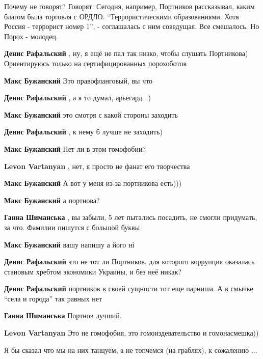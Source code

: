 \begin{itemize}

Почему не говорят? Говорят. Сегодня, например, Портников рассказывал, каким
благом была торговля с ОРДЛО. \enquote{Террористическими образованиями. Хотя Россия -
террорист номер 1}, - соглашалась с ним соведущая. Все смешалось. Но Порох -
молодец.

\begin{itemize} %
\textbf{Денис Рафальский} , ну, я ещё не пал так низко, чтобы слушать Портникова)
Ориентируюсь только на сертифицированных порохоботов

\textbf{Макс Бужанский} Это правофланговый, вы что

\textbf{Денис Рафальский} , а я то думал, арьегард...)

\textbf{Макс Бужанский} это смотря с какой стороны заходить

\textbf{Денис Рафальский} , к нему б лучше не заходить)

\textbf{Макс Бужанский} Нет ли в этом гомофобии?

\textbf{Levon Vartanyan} , нет, я просто не фанат его творчества

\textbf{Макс Бужанский} А вот у меня из-за портникова есть)))

\textbf{Макс Бужанский} а портнова?

\textbf{Ганна Шиманська} , вы забыли, 5 лет пытались посадить, не смогли придумать, за что.
Фамилии пишутся с большой буквы

\textbf{Макс Бужанский} вашу напишу а його ні

\textbf{Денис Рафальский} это не тот ли Портников, для которого коррупция оказалась становым хребтом экономики Украины, и без неё никак?

\textbf{Денис Рафальский} портников в своей сущности тот еще парниша. А в смычке \enquote{села и города} так равных нет

\textbf{Ганна Шиманська} Портнов лучший.

\textbf{Levon Vartanyan} Это не гомофобия, это гомоиздевательство и гомонасмешка))
\end{itemize} %

Я бы сказал что мы на них танцуем, а не топчемся (на граблях), к сожалению ...


\end{itemize}
